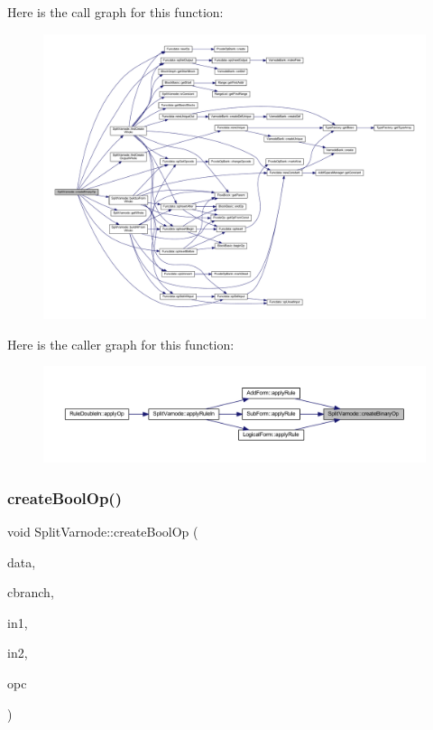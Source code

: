 Here is the call graph for this function\+:
\nopagebreak
\begin{figure}[H]
\begin{center}
\leavevmode
\includegraphics[width=350pt]{class_split_varnode_a20df0a8fa4eba1c02fd24ae129272d71_cgraph}
\end{center}
\end{figure}
Here is the caller graph for this function\+:
\nopagebreak
\begin{figure}[H]
\begin{center}
\leavevmode
\includegraphics[width=350pt]{class_split_varnode_a20df0a8fa4eba1c02fd24ae129272d71_icgraph}
\end{center}
\end{figure}
\mbox{\label{class_split_varnode_a7cc1768236a8f0edf17b3b8e31bb2eb4}} 
\subsubsection{\texorpdfstring{createBoolOp()}{createBoolOp()}}
{\footnotesize\ttfamily void Split\+Varnode\+::create\+Bool\+Op (\begin{DoxyParamCaption}\item[{\mbox{\hyperlink{class_funcdata}{Funcdata}} \&}]{data,  }\item[{\mbox{\hyperlink{class_pcode_op}{Pcode\+Op}} $\ast$}]{cbranch,  }\item[{\mbox{\hyperlink{class_split_varnode}{Split\+Varnode}} \&}]{in1,  }\item[{\mbox{\hyperlink{class_split_varnode}{Split\+Varnode}} \&}]{in2,  }\item[{\mbox{\hyperlink{opcodes_8hh_abeb7dfb0e9e2b3114e240a405d046ea7}{Op\+Code}}}]{opc }\end{DoxyParamCaption})\hspace{0.3cm}{\ttfamily [static]}}



